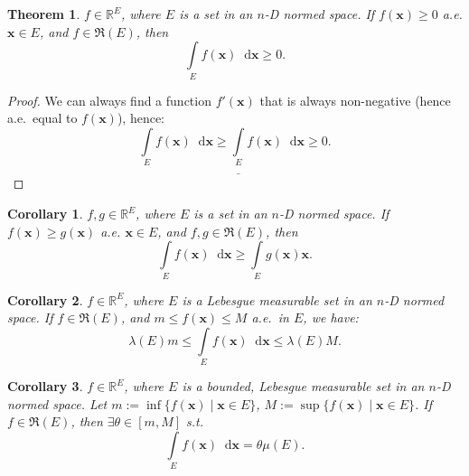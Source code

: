 \documentclass[openany]{book}
\theoremstyle{plain}
\newtheorem{theorem}{Theorem}[section] %
\newtheorem{corollary}{Corollary} %
\theoremstyle{definition}
\newcommand{\dif}{\mathop{}\!\mathrm{d}} %
\newcommand*{\bv}{\boldsymbol} %
\begin{document}
\begin{theorem}\label{theorem: the integral of a non-negative function is also non-negative}
	$f \in \mathbb R^E$, where $E$ is a set in an $n$-D normed space.
	If $f(\bv x) \geq 0$ a.e. $\bv x \in E$, and $f \in \mathfrak R(E)$, then
	\begin{equation*}
		\int\limits_E f(\bv x) \dif \bv x \geq 0.
	\end{equation*}
\end{theorem}
\begin{proof}
	We can always find a function $f'(\bv x)$ that is always non-negative (hence a.e.\ equal to $f(\bv x)$), hence:
	\begin{equation*}
		\int\limits_E f(\bv x) \dif \bv x 
			\geq \underline{\int\limits_E} f(\bv x) \dif \bv x \geq 0.
	\end{equation*}
\end{proof}

\begin{corollary}
	$f, g \in \mathbb R^E$, where $E$ is a set in an $n$-D normed space.
	If $f(\bv x) \geq g(\bv x)$ a.e. $\bv x \in E$, and $f, g \in \mathfrak R(E)$, then
	\begin{equation*}
		\int\limits_E f(\bv x) \dif \bv x \geq \int\limits_E g(\bv x) \bv x.
	\end{equation*}
\end{corollary}

\begin{corollary}\label{corollary: integral average}
	$f \in \mathbb R^E$, where $E$ is a Lebesgue measurable set in an $n$-D normed space. 
	If $f \in \mathfrak R(E)$, and $m \leq f(\bv x) \leq M$ a.e.\ in $E$, we have:
	\begin{equation*}
		\lambda(E) m \leq \int\limits_E f(\bv x) \dif \bv x \leq \lambda(E) M.
	\end{equation*}
\end{corollary}

\begin{corollary}
	$f \in \mathbb R^E$, where $E$ is a bounded, Lebesgue measurable set in an $n$-D normed space. 
	Let $m := \inf\{f(\bv x) \mid \bv x \in E\}$, $M := \sup\{f(\bv x) \mid \bv x \in E\}$.
	If $f \in \mathfrak R(E)$, then $\exists \theta \in [m, M]$ s.t.\ 
	\begin{equation*}
		\int\limits_E f(\bv x) \dif \bv x = \theta \mu(E).
	\end{equation*}
\end{corollary}
\end{document}

